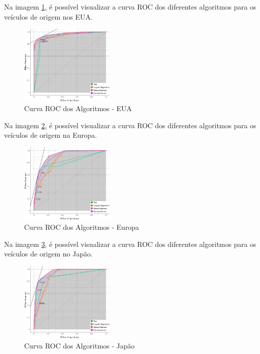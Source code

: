 \documentclass[conference]{IEEEtran}
\begin{document}
Na imagem \ref{fig:roc_eua}, é possível visualizar a curva ROC dos diferentes algoritmos para os veículos de origem nos EUA.
\begin{figure}[!ht]
	\centering
	\includegraphics[width=0.4\textwidth]{Resources/ROC_EUA.png}
	\caption{Curva ROC dos Algoritmos - EUA}
	\label{fig:roc_eua}
\end{figure}
Na imagem \ref{fig:roc_eu}, é possível visualizar a curva ROC dos diferentes algoritmos para os veículos de origem na Europa.
\begin{figure}[!ht]
	\centering
	\includegraphics[width=0.4\textwidth]{Resources/ROC_EU.png}
	\caption{Curva ROC dos Algoritmos - Europa}
	\label{fig:roc_eu}
\end{figure}
Na imagem \ref{fig:roc_jp}, é possível visualizar a curva ROC dos diferentes algoritmos para os veículos de origem no Japão.
\begin{figure}[!ht]
	\centering
	\includegraphics[width=0.4\textwidth]{Resources/ROC_JP.png}
	\caption{Curva ROC dos Algoritmos - Japão}
	\label{fig:roc_jp}
\end{figure}
\newpage

\end{document}
